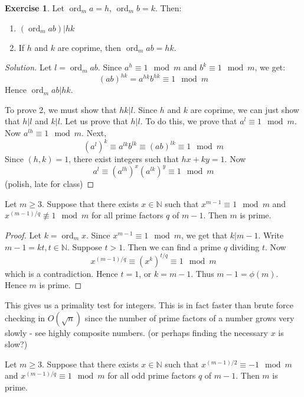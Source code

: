 \documentclass[12pt,letterpaper]{book}
\theoremstyle{definition}
\newtheorem*{exercise}{Exercise}
\newenvironment{solution}
  {\renewcommand\qedsymbol{$\blacksquare$}\begin{proof}[Solution]}
  {\end{proof}}
\newcommand{\N}{\mathbb{N}}
\DeclareMathOperator{\ord}{ord}
\begin{document}
\begin{exercise}
  Let $\ord_m a = h$, $\ord_m b = k$. Then:
  \begin{enumerate}
    \item $(\ord_m ab) | hk$
    \item If $h$ and $k$ are coprime, then $\ord_m ab = hk$.
  \end{enumerate}
\end{exercise}
\begin{solution}
  Let $l = \ord_m ab$. Since $a^h \equiv 1 \mod m$ and $b^k \equiv 1 \mod m$, we get:
  \[(ab)^{hk} = a^{hk} b^{hk} \equiv 1 \mod m\]
  Hence $\ord_m ab|hk$.

  To prove 2, we must show that $hk|l$. Since $h$ and $k$ are coprime, we can just show that $h|l$ and $k|l$. Let us prove that $h|l$. To do this, we prove that $a^l \equiv 1 \mod m$. Now $a^{lh} \equiv 1 \mod m$. Next,
  \[(a^l)^k \equiv a^{lk} b^{lk} \equiv (ab)^{lk} \equiv 1 \mod m\]
  Since $(h,k) = 1$, there exist integers such that $hx+ky = 1$. Now 
  \[a^l \equiv (a^{lh})^x (a^{lk})^y \equiv 1 \mod m\]
  (polish, late for class)
\end{solution}

\begin{theorem}
  Let $m \geq 3$. Suppose that there exists $x \in \N$ such that $x^{m-1} \equiv 1 \mod m$ and $x^{(m-1)/q} \not \equiv 1 \mod m$ for all prime factors $q$ of $m-1$. Then $m$ is prime.
\end{theorem}
\begin{proof}
  Let $k = \ord_m x$. Since $x^{m-1} \equiv 1 \mod m$, we get that $k|m-1$. Write $m-1 = kt, t \in \N$. Suppose $t > 1$. Then we can find a prime $q$ dividing $t$. Now
  \[x^{(m-1)/q} \equiv (x^k)^{t/q} \equiv 1 \mod m\]
  which is a contradiction. Hence $t = 1$, or $k = m-1$. Thus $m-1 = \phi(m)$. Hence $m$ is prime.
\end{proof}

This gives us a primality test for integers. This is in fact faster than brute force checking in $O(\sqrt{n})$ since the number of prime factors of a number grows very slowly - see highly composite numbers. (or perhaps finding the necessary $x$ is slow?)

\begin{corollary}
  Let $m \geq 3$. Suppose  that there exists $x \in \N$ such that $x^{(m-1)/2} \equiv -1 \mod m$ and $x^{(m-1)/q} \equiv 1 \mod m$ for all odd prime factors $q$ of $m-1$. Then $m$ is prime.
\end{corollary}
\end{document}
